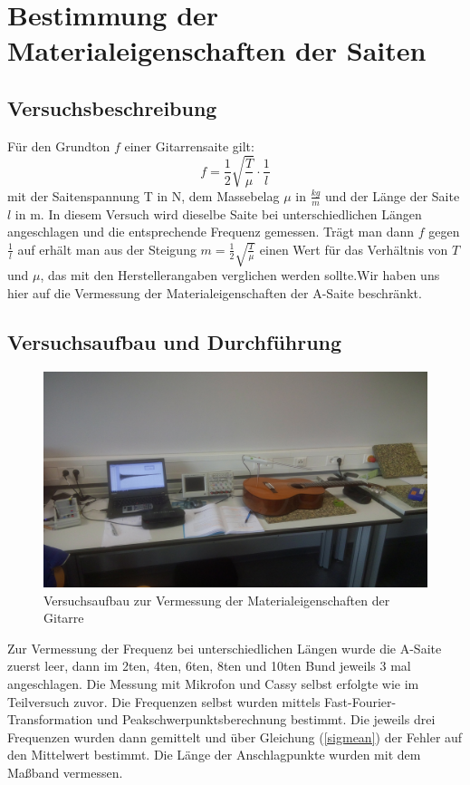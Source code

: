 \documentclass[12pt,a4paper]{article}
\author{Gruppe C14 \\ Julián Häck, Martin Koytek, Lars Wenning, Erik Zimmermann}
\begin{document}
\section{Bestimmung der Materialeigenschaften der Saiten}
\subsection{Versuchsbeschreibung}
Für den Grundton $f$ einer Gitarrensaite gilt:
\begin{equation}
f=\frac{1}{2}\sqrt{\frac{T}{\mu}}\cdot \frac{1}{l}
\label{Grundgleichung Gitarre f gegen l}
\end{equation}
mit der Saitenspannung T in N, dem Massebelag $\mu$ in $\frac{kg}{m}$ und der Länge der Saite $l$ in m.
In diesem Versuch wird dieselbe Saite bei unterschiedlichen Längen angeschlagen und die entsprechende Frequenz gemessen. Trägt man dann $f$ gegen $\frac{1}{l}$ auf erhält man aus der Steigung $m=\frac{1}{2}\sqrt{\frac{T}{\mu}}$ einen Wert für das Verhältnis von $T$ und $\mu$, das mit den Herstellerangaben verglichen werden sollte.\newline Wir haben uns hier auf die Vermessung der Materialeigenschaften der A-Saite beschränkt.

\subsection{Versuchsaufbau und Durchführung}
\begin{figure}[H]
\centering
\includegraphics[scale=0.1]{Bilder/IMG_20160323_123920.jpg}
\caption{Versuchsaufbau zur Vermessung der Materialeigenschaften der Gitarre}
\end{figure}
Zur Vermessung der Frequenz bei unterschiedlichen Längen wurde die A-Saite zuerst leer, dann im 2ten, 4ten, 6ten, 8ten und 10ten Bund jeweils 3 mal angeschlagen. Die Messung mit Mikrofon und Cassy selbst erfolgte wie im Teilversuch zuvor.
Die Frequenzen selbst wurden mittels Fast-Fourier-Transformation und Peakschwerpunktsberechnung bestimmt. Die jeweils drei Frequenzen wurden dann gemittelt und über Gleichung (\ref{sigmean}) der Fehler auf den Mittelwert bestimmt.
\newline
Die Länge der Anschlagpunkte wurden mit dem Maßband vermessen.\newline
\end{document}
